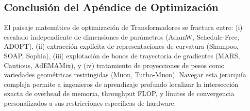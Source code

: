 \documentclass[11pt,a4paper]{article}
\begin{document}
\subsection{Conclusión del Apéndice de Optimización}

El paisaje matemático de optimización de Transformadores se fractura entre: (i) escalado independiente de dimensiones de parámetros (AdamW, Schedule-Free, ADOPT), (ii) extracción explícita de representaciones de curvatura (Shampoo, SOAP, Sophia), (iii) explotación de bonos de trayectoria de gradientes (MARS, Cautious, AdEMAMix), y (iv) tratamiento de proyecciones de pesos como variedades geométricas restringidas (Muon, Turbo-Muon). Navegar esta jerarquía compleja permite a ingenieros de aprendizaje profundo localizar la intersección exacta de overhead de memoria, throughput FLOP, y límites de convergencia personalizados a sus restricciones específicas de hardware.



\end{document}
